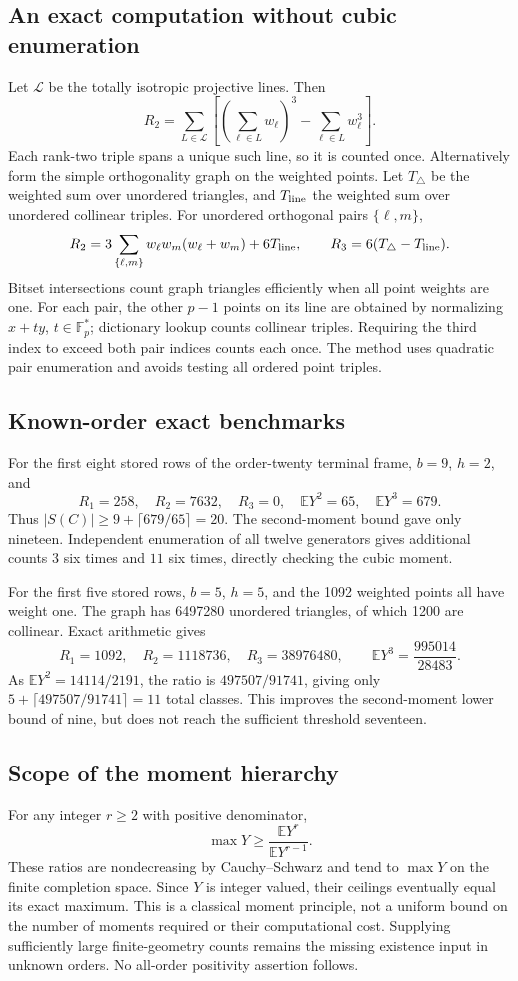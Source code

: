\subsection{An exact computation without cubic enumeration}
Let $\mathcal L$ be the totally isotropic projective lines. Then
\[
 R_2=\sum_{L\in\mathcal L}
 \left[\left(\sum_{\ell\in L}w_\ell\right)^3
              -\sum_{\ell\in L}w_\ell^3\right].
\]
Each rank-two triple spans a unique such line, so it is counted once.
Alternatively form the simple orthogonality graph on the weighted
points. Let $T_\triangle$ be the weighted sum over unordered triangles,
and $T_{\rm line}$ the weighted sum over unordered collinear triples.
For unordered orthogonal pairs $\{\ell,m\}$,
\[
 R_2=3\sum_{\{\ell,m\}}w_\ell w_m(w_\ell+w_m)+6T_{\rm line},
 \qquad R_3=6(T_\triangle-T_{\rm line}).
\]
Bitset intersections count graph triangles efficiently when all point
weights are one. For each pair, the other $p-1$ points on its line
are obtained by normalizing $x+ty$, $t\in\mathbb F_p^*$; dictionary
lookup counts collinear triples. Requiring the third index to exceed
both pair indices counts each once. The method uses quadratic pair
enumeration and avoids testing all ordered point triples.

\subsection{Known-order exact benchmarks}
For the first eight stored rows of the order-twenty terminal frame,
$b=9$, $h=2$, and
\[
 R_1=258,\quad R_2=7632,\quad R_3=0,\quad
 \mathbb EY^2=65,\quad\mathbb EY^3=679.
\]
Thus $|S(C)|\ge9+\lceil679/65\rceil=20$.
The second-moment bound gave only nineteen. Independent enumeration
of all twelve generators gives additional counts $3$ six times and
$11$ six times, directly checking the cubic moment.

For the first five stored rows, $b=5$, $h=5$, and the 1092 weighted
points all have weight one. The graph has 6497280 unordered triangles,
of which 1200 are collinear. Exact arithmetic gives
\[
 R_1=1092,\quad R_2=1118736,\quad R_3=38976480,
 \qquad\mathbb EY^3=\frac{995014}{28483}.
\]
As $\mathbb EY^2=14114/2191$, the ratio is
$497507/91741$, giving only $5+\lceil497507/91741\rceil=11$
total classes. This improves the second-moment lower bound of nine,
but does not reach the sufficient threshold seventeen.

\subsection{Scope of the moment hierarchy}
For any integer $r\ge2$ with positive denominator,
\[
 \max Y\ge\frac{\mathbb EY^r}{\mathbb EY^{r-1}}.
\]
These ratios are nondecreasing by Cauchy--Schwarz and tend to
$\max Y$ on the finite completion space. Since $Y$ is integer valued,
their ceilings eventually equal its exact maximum. This is a
classical moment principle, not a uniform bound on the number of
moments required or their computational cost. Supplying sufficiently
large finite-geometry counts remains the missing existence input in
unknown orders. No all-order positivity assertion follows.

